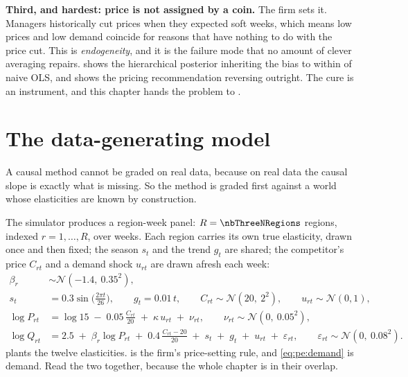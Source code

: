 \textbf{Third, and hardest: price is not assigned by a coin.} The firm sets it. Managers
historically cut prices when they expected soft weeks, which means low prices and low demand
coincide for reasons that have nothing to do with the price cut. This is \emph{endogeneity}, and
it is the failure mode that no amount of clever averaging repairs.  shows the
hierarchical posterior inheriting the bias to within \nbThreeHierVsOls{} of naive OLS, and shows
the pricing recommendation reversing outright. The cure is an instrument, and this chapter hands
the problem to .

\section{The data-generating model}
\label{sec:pe:dgm}

A causal method cannot be graded on real data, because on real data the causal slope is exactly
what is missing. So the method is graded first against a world whose elasticities are known by
construction.

The simulator produces a region-week panel: $R = \nbThreeNRegions$ regions, indexed
$r = 1, \dots, R$, over \nbThreeNWeeks{} weeks. Each region carries its own true
elasticity, drawn once and then fixed; the season $s_t$ and the trend $g_t$ are shared; the
competitor's price $C_{rt}$ and a demand shock $u_{rt}$ are drawn afresh each week:
%
\begin{align}
  \beta_r &\sim \mathcal N\!\left(-1.4,\ 0.35^{2}\right), \label{eq:pe:beta}\\
  s_t &= 0.3 \sin\!\Big(\tfrac{2\pi t}{26}\Big), \qquad g_t = 0.01\,t, \qquad
        C_{rt} \sim \mathcal N\!\left(20,\ 2^{2}\right), \qquad
        u_{rt} \sim \mathcal N(0, 1), \label{eq:pe:latent}\\
  \log P_{rt} &= \log 15 \;-\; 0.05\,\frac{C_{rt}}{20} \;+\; \kappa\, u_{rt} \;+\; \nu_{rt},
        \qquad \nu_{rt} \sim \mathcal N\!\left(0,\ 0.05^{2}\right), \label{eq:pe:price}\\
  \log Q_{rt} &= 2.5 \;+\; \beta_r \log P_{rt} \;+\; 0.4\,\frac{C_{rt} - 20}{20} \;+\; s_t \;+\; g_t
        \;+\; u_{rt} \;+\; \varepsilon_{rt},
        \qquad \varepsilon_{rt} \sim \mathcal N\!\left(0,\ 0.08^{2}\right). \label{eq:pe:demand}
\end{align}
%
 plants the twelve elasticities.  is the firm's price-setting
rule, and \cref{eq:pe:demand} is demand. Read the two together, because the whole chapter is in
their overlap.

